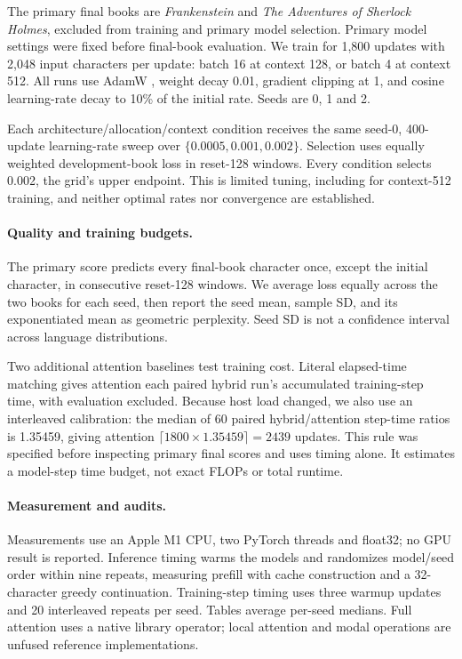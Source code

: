 \documentclass[11pt,letterpaper]{article}
\begin{document}
The primary final books are \emph{Frankenstein} and \emph{The Adventures of Sherlock Holmes}, excluded from training and primary model selection. Primary model settings were fixed before final-book evaluation. We train for 1,800 updates with 2,048 input characters per update: batch 16 at context 128, or batch 4 at context 512. All runs use AdamW \cite{adamw}, weight decay 0.01, gradient clipping at 1, and cosine learning-rate decay to 10\% of the initial rate. Seeds are 0, 1 and 2.

Each architecture/allocation/context condition receives the same seed-0, 400-update learning-rate sweep over $\{0.0005,0.001,0.002\}$. Selection uses equally weighted development-book loss in reset-128 windows. Every condition selects 0.002, the grid's upper endpoint. This is limited tuning, including for context-512 training, and neither optimal rates nor convergence are established.

\paragraph{Quality and training budgets.}
The primary score predicts every final-book character once, except the initial character, in consecutive reset-128 windows. We average loss equally across the two books for each seed, then report the seed mean, sample SD, and its exponentiated mean as geometric perplexity. Seed SD is not a confidence interval across language distributions.

Two additional attention baselines test training cost. Literal elapsed-time matching gives attention each paired hybrid run's accumulated training-step time, with evaluation excluded. Because host load changed, we also use an interleaved calibration: the median of 60 paired hybrid/attention step-time ratios is 1.35459, giving attention $\lceil1800\times1.35459\rceil=2439$ updates. This rule was specified before inspecting primary final scores and uses timing alone. It estimates a model-step time budget, not exact FLOPs or total runtime.

\paragraph{Measurement and audits.}
Measurements use an Apple M1 CPU, two PyTorch threads and float32; no GPU result is reported. Inference timing warms the models and randomizes model/seed order within nine repeats, measuring prefill with cache construction and a 32-character greedy continuation. Training-step timing uses three warmup updates and 20 interleaved repeats per seed. Tables average per-seed medians. Full attention uses a native library operator; local attention and modal operations are unfused reference implementations.
\end{document}
